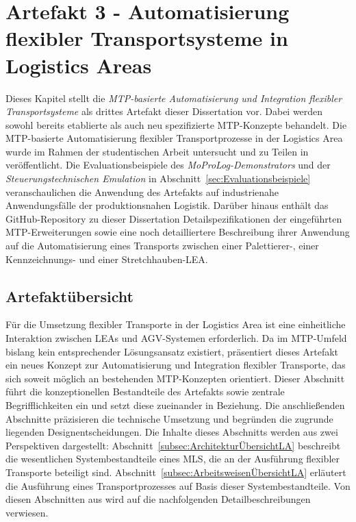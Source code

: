 \chapter{Artefakt 3 - Automatisierung flexibler Transportsysteme in Logistics Areas}
\label{chap:Art3LA}

Dieses Kapitel stellt die \emph{MTP-basierte Automatisierung und Integration flexibler Transportsysteme} als drittes Artefakt dieser Dissertation vor. Dabei werden sowohl bereits etablierte als auch neu spezifizierte MTP-Konzepte behandelt. Die MTP-basierte Automatisierung flexibler Transportprozesse in der Logistics Area wurde im Rahmen der studentischen Arbeit \cite{Henkel.2022} untersucht und zu Teilen in \cite{Blumenstein.INDIN,Blumenstein.MoProLog} veröffentlicht. Die Evaluationsbeispiele des \emph{MoProLog-Demonstrators} und der \emph{Steuerungstechnischen Emulation} in Abschnitt~\ref{sec:Evaluationsbeispiele} veranschaulichen die Anwendung des Artefakts auf industrienahe Anwendungsfälle der produktionsnahen Logistik. Darüber hinaus enthält das GitHub-Repository zu dieser Dissertation \cite{Blumenstein.Github} Detailspezifikationen der eingeführten MTP-Erweiterungen sowie eine noch detailliertere Beschreibung ihrer Anwendung auf die Automatisierung eines Transports zwischen einer Palettierer-, einer Kennzeichnungs- und einer Stretchhauben-LEA.

\section{Artefaktübersicht}
\label{sec:Art3LAUebersicht}

Für die Umsetzung flexibler Transporte in der Logistics Area ist eine einheitliche Interaktion zwischen LEAs und AGV-Systemen erforderlich. Da im MTP-Umfeld bislang kein entsprechender Lösungsansatz existiert, präsentiert dieses Artefakt ein neues Konzept zur Automatisierung und Integration flexibler Transporte, das sich soweit möglich an bestehenden MTP-Konzepten orientiert. Dieser Abschnitt führt die konzeptionellen Bestandteile des Artefakts sowie zentrale Begrifflichkeiten ein und setzt diese zueinander in Beziehung. Die anschließenden Abschnitte präzisieren die technische Umsetzung und begründen die zugrunde liegenden Designentscheidungen. Die Inhalte dieses Abschnitts werden aus zwei Perspektiven dargestellt: Abschnitt~\ref{subsec:ArchitekturÜbersichtLA} beschreibt die wesentlichen Systembestandteile eines MLS, die an der Ausführung flexibler Transporte beteiligt sind. Abschnitt~\ref{subsec:ArbeitsweisenÜbersichtLA} erläutert die Ausführung eines Transportprozesses auf Basis dieser Systembestandteile. Von diesen Abschnitten aus wird auf die nachfolgenden Detailbeschreibungen verwiesen.

